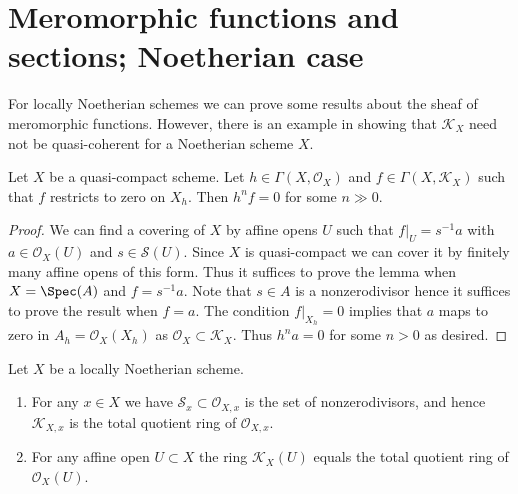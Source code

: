 \section{Meromorphic functions and sections; Noetherian case}
\label{section-meromorphic-noetherian}

\noindent
For locally Noetherian schemes we can prove some results about the
sheaf of meromorphic functions. However, there is an example in
\cite{misconceptions} showing that $\mathcal{K}_X$ need not be quasi-coherent
for a Noetherian scheme $X$.

\begin{lemma}
\label{lemma-meromorphic-section-restricts-to-zero}
Let $X$ be a quasi-compact scheme. Let $h \in \Gamma(X, \mathcal{O}_X)$ and
$f \in \Gamma(X, \mathcal{K}_X)$ such that $f$ restricts
to zero on $X_h$. Then $h^n f = 0$ for some $n \gg 0$.
\end{lemma}

\begin{proof}
We can find a covering of $X$ by affine opens $U$ such that $f|_U = s^{-1}a$
with $a \in \mathcal{O}_X(U)$ and $s \in \mathcal{S}(U)$. Since $X$ is
quasi-compact we can cover it by finitely many affine opens of this form.
Thus it suffices to prove the lemma when $X = \Spec(A)$ and $f = s^{-1}a$.
Note that $s \in A$ is a nonzerodivisor hence it suffices to prove
the result when $f = a$. The condition $f|_{X_h} = 0$ implies that
$a$ maps to zero in $A_h = \mathcal{O}_X(X_h)$ as
$\mathcal{O}_X \subset \mathcal{K}_X$. Thus $h^na = 0$ for some $n > 0$
as desired.
\end{proof}

\begin{lemma}
\label{lemma-locally-Noetherian-K}
Let $X$ be a locally Noetherian scheme.
\begin{enumerate}
\item For any $x \in X$ we have $\mathcal{S}_x \subset \mathcal{O}_{X, x}$
is the set of nonzerodivisors, and hence $\mathcal{K}_{X, x}$
is the total quotient ring of $\mathcal{O}_{X, x}$.
\item For any affine open $U \subset X$ the ring
$\mathcal{K}_X(U)$ equals the total quotient ring of $\mathcal{O}_X(U)$.
\end{enumerate}
\end{lemma}

